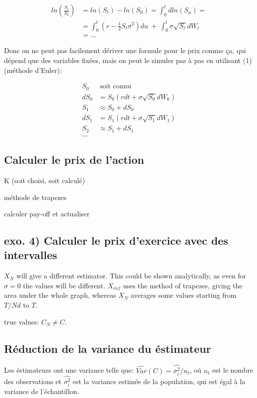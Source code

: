\documentclass[a4paper,12pt]{scrartcl}
\begin{document}
\begin{align*}
ln( \frac{S_t}{S_0} ) 
&= ln(S_t)-ln(S_0) = \int_0^t dln(S_u) = \\
&= \int_0^t (r-\frac{1}{2} S_t \sigma^2)du~+~\int_0^t \sigma \sqrt{S_t}dW_t \\
&=\dots
\end{align*}

Donc on ne peut pas facilement dériver une formule pour le prix comme ça, qui dépend que des variables fixées, mais on peut le simuler pas à pas en utilisant (1) (méthode d'Euler):

\begin{equation} \label{6}
\begin{split}
S_0  &~\text{soit connu} \\
dS_0 &= S_0(rdt + \sigma \sqrt{S_0} dW_0) \\
S_1  &\approx S_0 + dS_0 \\
dS_1 &= S_1(rdt + \sigma \sqrt{S_1} dW_1) \\
S_2  &\approx S_1 + dS_1 \\
\dots
\end{split}
\end{equation}

\subsection{Calculer le prix de l'action}

K (soit choisi, soit calculé)

méthode de trapezes

calculer pay-off et actualiser

\subsection{exo. 4) Calculer le prix d'exercice avec des intervalles}
$X_N$ will give a different estimator.
This could be shown analytically, as even for $\sigma = 0$ the values will be different.
$X_{inf}$ uses the method of trapezes, giving the area under the whole graph, whereas $X_N$ averages some values starting from $T/Nd$ to $T$.

true values: $C_N \neq C$.

\subsection{Réduction de la variance du éstimateur}

Les éstimateurs ont une variance telle que:
$ \hat{Var}(C) = \hat{\sigma_i^2} / n_t$, oú $n_t$ est le nombre des observations et $\hat{\sigma_i^2}$ est la variance estimée de la population, qui est égal à la variance de l'échantillon.
\end{document}
